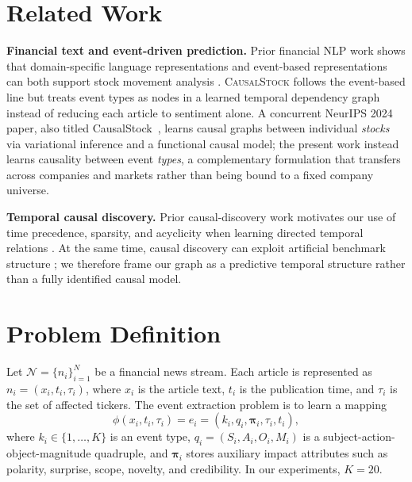 \documentclass[sigconf,review]{acmart}
\begin{document}
\section{Related Work}

\textbf{Financial text and event-driven prediction.} Prior financial NLP work shows that domain-specific language representations and event-based representations can both support stock movement analysis \cite{araci2019,xu2018stocknet,hu2018han,sawhney2020man,sawhney2021fast,xu2021rest,koa2024sep,ding2014structured,ding2015deep,chen2019finegrained,zhou2021trade}. \textsc{CausalStock} follows the event-based line but treats event types as nodes in a learned temporal dependency graph instead of reducing each article to sentiment alone. A concurrent NeurIPS 2024 paper, also titled CausalStock~\cite{li2024causalstock}, learns causal graphs between individual \emph{stocks} via variational inference and a functional causal model; the present work instead learns causality between event \emph{types}, a complementary formulation that transfers across companies and markets rather than being bound to a fixed company universe.

\textbf{Temporal causal discovery.} Prior causal-discovery work motivates our use of time precedence, sparsity, and acyclicity when learning directed temporal relations \cite{granger1969,zheng2018notears,tank2022,nauta2019}. At the same time, causal discovery can exploit artificial benchmark structure \cite{reisach2021beware}; we therefore frame our graph as a predictive temporal structure rather than a fully identified causal model.

\section{Problem Definition}

Let $\mathcal{N}=\{n_i\}_{i=1}^{N}$ be a financial news stream. Each article is represented as $n_i=(x_i,t_i,\tau_i)$, where $x_i$ is the article text, $t_i$ is the publication time, and $\tau_i$ is the set of affected tickers. The event extraction problem is to learn a mapping
\begin{equation}
\phi(x_i,t_i,\tau_i)=e_i=(k_i,q_i,\boldsymbol{\pi}_i,\tau_i,t_i),
\end{equation}
where $k_i\in\{1,\ldots,K\}$ is an event type, $q_i=(S_i,A_i,O_i,M_i)$ is a subject-action-object-magnitude quadruple, and $\boldsymbol{\pi}_i$ stores auxiliary impact attributes such as polarity, surprise, scope, novelty, and credibility. In our experiments, $K=20$.
\end{document}
